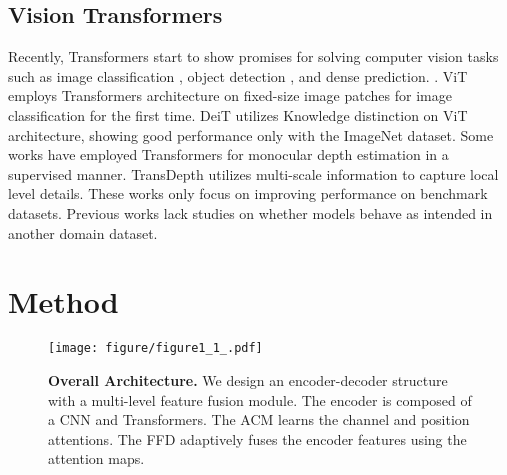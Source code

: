 \documentclass[letterpaper]{article} \usepackage{aaai23}  \usepackage{times}  \usepackage{helvet}  \usepackage{courier}  \usepackage[hyphens]{url}  \usepackage{graphicx} \urlstyle{rm} \def\UrlFont{\rm}  \usepackage{natbib}  \usepackage{caption} \frenchspacing  \setlength{\pdfpagewidth}{8.5in} \setlength{\pdfpageheight}{11in} \usepackage{algorithm}
\begin{document}
\subsection{Vision Transformers}
Recently, Transformers \cite{vaswani2017attention} start to show promises for solving computer vision tasks such as image classification \cite{dosovitskiy2020image,touvron2021training}, object detection \cite{carion2020end}, and dense prediction. \cite{zheng2021rethinking,ranftl2021vision,yang2021transformer,guizilini2022multi}. 
ViT \cite{dosovitskiy2020image} employs Transformers architecture on fixed-size image patches for image classification for the first time. DeiT \cite{touvron2021training} utilizes Knowledge distinction on ViT architecture, showing good performance only with the ImageNet dataset.
Some works \cite{ranftl2021vision,yang2021transformer} have employed Transformers for monocular depth estimation in a supervised manner. 
TransDepth \cite{yang2021transformer} utilizes multi-scale information to capture local level details.  These works \cite{zheng2021rethinking,yang2021transformer} only focus on improving performance on benchmark datasets. Previous works lack studies on whether models behave as intended in another domain dataset.


\section{Method}

\begin{figure*}[t] 
\begin{center}
\texttt{[image: figure/figure1\_1\_.pdf]}
\end{center}
\caption{\textbf{Overall Architecture.} We design an encoder-decoder structure with a multi-level feature fusion module. The encoder is composed of a CNN and Transformers. The ACM learns the channel and position attentions. The FFD adaptively fuses the encoder features using the attention maps.}
\label{figure_network_overview}
\end{figure*} 
\end{document}
